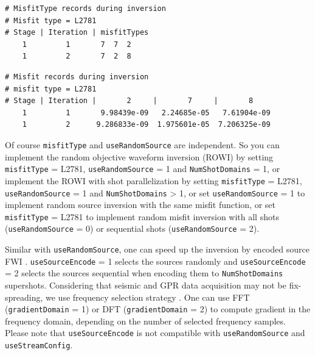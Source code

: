 \documentclass[pdftex,a4paper,parskip,listof=totoc,bibliography=totoc,onehalfspacing,12pt]{scrreprt}
\begin{document}
\begin{verbatim}
# MisfitType records during inversion
# Misfit type = L2781
# Stage | Iteration | misfitTypes
    1         1       7  7  2
    1         2       7  2  8
\end{verbatim}
\begin{verbatim}
# Misfit records during inversion
# misfit type = L2781
# Stage | Iteration |       2     |       7     |       8      
    1         1       9.98439e-09   2.24685e-05   7.61904e-09
    1         2      9.286833e-09  1.975601e-05  7.206325e-09
\end{verbatim}
Of course \verb+misfitType+ and \verb+useRandomSource+ are independent. So you can implement the random objective waveform inversion (ROWI) \citep{pan2020random} by setting \verb+misfitType+ = L2781, \verb+useRandomSource+ = 1 and \verb+NumShotDomains+ = 1, or implement the ROWI with shot parallelization by setting \verb+misfitType+ = L2781, \verb+useRandomSource+ = 1 and \verb+NumShotDomains+ > 1, or set \verb+useRandomSource+ = 1 to implement random source inversion with the same misfit function, or set \verb+misfitType+ = L2781 to implement random misfit inversion with all shots (\verb+useRandomSource+ = 0) or sequential shots (\verb+useRandomSource+ = 2).

Similar with \verb+useRandomSource+, one can speed up the inversion by encoded source FWI \citep{krebs2009fast}. \verb+useSourceEncode+ = 1 selects the sources randomly and \verb+useSourceEncode+ = 2 selects the sources sequential when encoding them to \verb+NumShotDomains+ supershots. Considering that seismic and GPR data acquisition may not be fix-spreading, we use frequency selection strategy \citep{huang2012multisource,zhang2018hybrid,zhang2019elastic}. One can use FFT (\verb+gradientDomain+ = 1) or DFT (\verb+gradientDomain+ = 2) to compute gradient in the frequency domain, depending on the number of selected frequency samples. Please note that \verb+useSourceEncode+ is not compatible with \verb+useRandomSource+ and \verb+useStreamConfig+.
\end{document}
